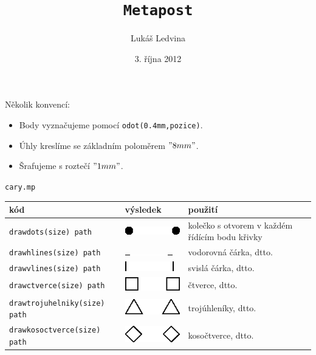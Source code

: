 \documentclass[a4paper,10pt]{article}
\title{\texttt{Metapost}}
\author{Lukáš Ledvina}
\date{3. října 2012}
\begin{document}
\maketitle

Několik konvencí:
\begin{itemize}
\item Body vyznačujeme pomocí \verb+odot(0.4mm,pozice)+.
\item Úhly kreslíme se základním poloměrem $"8 mm"$.
\item Šrafujeme s roztečí $"1 mm"$.
\end{itemize}

{\centering\large\texttt{cary.mp}\nopagebreak\\\medskip}
\begin{tabularx}{\textwidth}{|l|l|X|}\hline
    kód & výsledek & použití\\\hline
    \verb+drawdots(size) path+ & \includegraphics{mp_cary_1} & 
	kolečko s otvorem v každém řídícím bodu křivky\\\hline
    \verb+drawhlines(size) path+ & \includegraphics{mp_cary_2}&
	vodorovná čárka, dtto.\\\hline
    \verb+drawvlines(size) path+ & \includegraphics{mp_cary_3}&
	svislá čárka, dtto.\\\hline
    \verb+drawctverce(size) path+ & \includegraphics{mp_cary_4}&
	čtverce, dtto.\\\hline
    \verb+drawtrojuhelniky(size) path+ & \includegraphics{mp_cary_5}&
	trojúhleníky, dtto.\\\hline
    \verb+drawkosoctverce(size) path+ & \includegraphics{mp_cary_6}&
	kosočtverce, dtto.\\\hline
\end{tabularx}\bigskip
\end{document}
